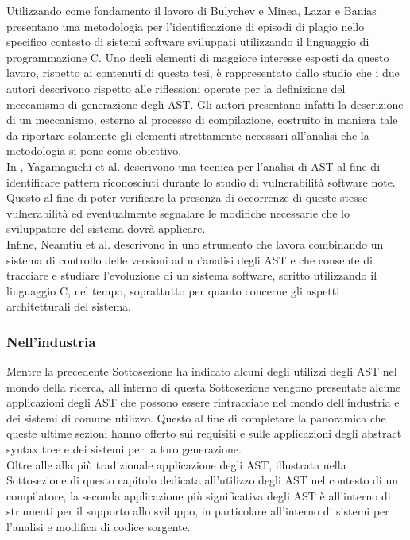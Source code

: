Utilizzando come fondamento il lavoro di Bulychev e Minea, Lazar e Banias
presentano una metodologia \cite{DBLP:conf/saci/LazarB14} per l’identificazione
di episodi di plagio nello specifico contesto di sistemi software sviluppati
utilizzando il linguaggio di programmazione C. Uno degli elementi di maggiore
interesse esposti da questo lavoro, rispetto ai contenuti di questa tesi, è
rappresentato dallo studio che i due autori descrivono rispetto alle riflessioni
operate per la definizione del meccanismo di generazione degli AST. Gli autori
presentano infatti la descrizione di un meccanismo, esterno al processo di
compilazione, costruito in maniera tale da riportare solamente gli elementi
strettamente necessari all’analisi che la metodologia si pone come obiettivo.\\

In \cite{DBLP:conf/acsac/YamaguchiLR12}, Yagamaguchi et al. descrivono una
tecnica per l’analisi di AST al fine di identificare pattern riconosciuti
durante lo studio di vulnerabilità software note. Questo al fine di poter
verificare la presenza di occorrenze di queste stesse vulnerabilità ed
eventualmente segnalare le modifiche necessarie che lo sviluppatore del sistema
dovrà applicare.\\

Infine, Neamtiu et al. descrivono in \cite{DBLP:journals/sigsoft/NeamtiuFH05}
uno strumento che lavora combinando un sistema di controllo delle versioni ad
un’analisi degli AST e che consente di tracciare e studiare l’evoluzione di un
sistema software, scritto utilizzando il linguaggio C, nel tempo, soprattutto
per quanto concerne gli aspetti architetturali del sistema.

\subsubsection{Nell’industria}

Mentre la precedente Sottosezione ha indicato alcuni degli utilizzi degli AST
nel mondo della ricerca, all’interno di questa Sottosezione vengono presentate
alcune applicazioni degli AST che possono essere rintracciate nel mondo
dell’industria e dei sistemi di comune utilizzo. Questo al fine di completare la
panoramica che queste ultime sezioni hanno offerto sui requisiti e sulle
applicazioni degli abstract syntax tree e dei sistemi per la loro generazione.\\

Oltre alle alla più tradizionale applicazione degli AST, illustrata nella
Sottosezione di questo capitolo dedicata all’utilizzo degli AST nel contesto di
un compilatore, la seconda applicazione più significativa degli AST è
all’interno di strumenti per il supporto allo sviluppo, in particolare
all’interno di sistemi per l'analisi e modifica di codice sorgente.\\


